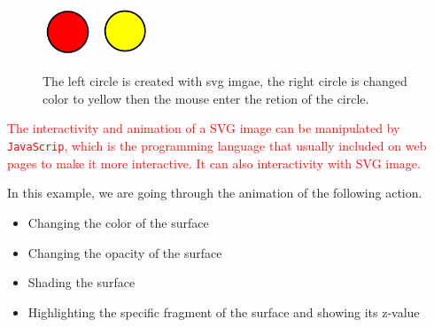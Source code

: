 \documentclass[paper=a4, fontsize=11pt]{report}
\begin{document}
\begin{figure}[h]
\begin{center}
  \includegraphics[height = 1.45cm, width = 1.6cm]{figure/svg/svgdemo0.PNG}
  \hspace{4cm}
  \includegraphics[height = 1.5cm, width = 1.5cm]{figure/svg/svgdemo1.PNG}
  \caption{The left circle is created with svg imgae, the right circle is changed color to yellow then the mouse enter the retion of the circle. }
  	\label{Example_6.3.0}
\end{center}
\end{figure}


\textcolor{red}{
The interactivity and animation of a SVG image can be manipulated by \texttt{JavaScrip}, which is the programming language that usually included on web pages to make it more interactive. It can also interactivity with SVG image.
}

In this example, we are going through the animation of the following action.
\begin{itemize}
  \item Changing the color of the surface
  \item Changing the opacity of the surface
  \item Shading the surface
  \item Highlighting the specific fragment of the surface and showing its z-value  
\end{itemize}
\\

\textcolor{red}{

}
\end{document}
